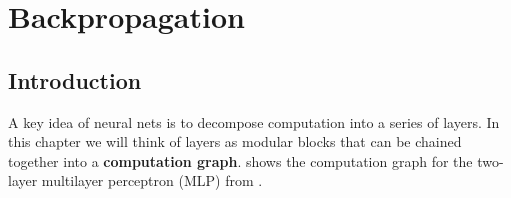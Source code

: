 
\chapter{Backpropagation}\label{chapter:backpropagation}

\section{Introduction}
A key idea of neural nets is to decompose computation into a series of layers. In this chapter we will think of layers as modular blocks that can be chained together into a \textbf{computation graph}. \Fig{\ref{fig:backpropagation:simple_MLP}} shows the computation graph for the two-layer multilayer perceptron (MLP) from \chap{\ref{chapter:neural_nets}}.

